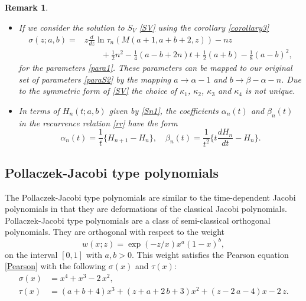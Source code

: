 \documentclass[12pt]{article}
\newtheorem{mydef3}{Remark}[section]
\numberwithin{figure}{section}
\numberwithin{equation}{section}
\numberwithin{table}{section}
\begin{document}
\begin{mydef3}{\quad \phantom{x}
\begin{itemize}
\item
If we consider the solution to $S_V$ \eqref{SV} using the corollary \eqref{corollary3}
\begin{align}
\sigma(z; a, b)=&z\frac{d}{dz}\ln
\tau_n(M({ a+1, a+ b+2,z}))-nz\nonumber\\&\qquad+\tfrac{1}{2}n^2-\tfrac{1}{4}(a-b+2n)t+\tfrac{1}{2}(a+b)-\tfrac{1}{8}(a-b)^2\nonumber,
\end{align}
for the parameters \eqref{para1}. These parameters can be mapped to our original set of parameters \eqref{paraS2} by the mapping
$ a\rightarrow \alpha-1$ and $ b\rightarrow \beta-\alpha-n$. Due to the symmetric form of \eqref{SV} the choice of $\kappa_1$, $\kappa_2$, $\kappa_3$ and $\kappa_4$ is not unique.
\item
In terms of $H_n(t; a, b)$ given by \eqref{Sn1}, the coefficients $\alpha_n(t)$ and $\beta_n(t)$ in the recurrence relation \eqref{rr} have the
form
\begin{equation}\nonumber
\alpha_n(t)=\frac{1}{t}\bigg\{H_{n+1}-H_n\bigg\},\quad
\beta_n(t)=\frac{1}{t^2}\bigg\{t\frac{dH_n}{dt}-H_{n}\bigg\}.
\end{equation}
\end{itemize}}
\end{mydef3}
\subsection{Pollaczek-Jacobi type polynomials}
The Pollaczek-Jacobi type polynomials are similar to the time-dependent Jacobi polynomials in that they are deformations of the classical Jacobi
polynomials.
Pollaczek-Jacobi type polynomials are a class of semi-classical orthogonal polynomials. They are orthogonal with respect to the weight
\begin{equation}
w(x;z)=\exp(-z/x)x^ a(1-x)^ b,\label{weight2}
\end{equation}
on the interval $[0,1]$ with $ a, b>0$. This weight satisfies the Pearson equation \eqref{Pearson} with the following $\sigma(x)$ and $\tau(x)$:
\begin{align*}
\sigma(x)&={x}^{4}+{x}^{3}-2\,{x}^{2},\\
\tau(x)&=\left( a+b+4 \right) {x}^{3}+ \left(z+ a+2\,b+3 \right) {x}^{2}+\left( z-2\,a-4 \right) x-2\,z.
\end{align*}
\end{document}
